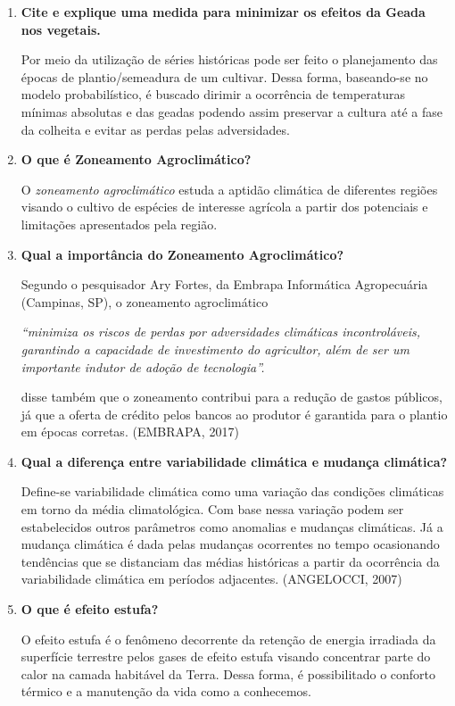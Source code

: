 \documentclass[a4paper, 12pt]{article}
\begin{document}
\begin{enumerate}
		\item\textbf{Cite e explique uma medida para minimizar os efeitos da Geada nos vegetais.}
		
		Por meio da utilização de séries históricas pode ser feito o planejamento das épocas de plantio/semeadura de um cultivar. Dessa forma, baseando-se no modelo probabilístico, é buscado dirimir a ocorrência de temperaturas mínimas absolutas e das geadas podendo assim preservar a cultura até a fase da colheita e evitar as perdas pelas adversidades.
		
		\item\textbf{O que é Zoneamento Agroclimático?}
		
		O \textit{zoneamento agroclimático} estuda a aptidão climática de diferentes regiões visando o cultivo de espécies de interesse agrícola a partir dos potenciais e limitações apresentados pela região.
		
		\item\textbf{Qual a importância do Zoneamento Agroclimático?}
		
		Segundo o pesquisador Ary Fortes, da Embrapa Informática Agropecuária (Campinas, SP), o zoneamento agroclimático 
		
		\textit{``minimiza os riscos de perdas por adversidades climáticas incontroláveis, garantindo a capacidade de investimento do agricultor, além de ser um importante indutor de adoção de tecnologia''.}
		
		disse também que o zoneamento contribui para a redução de gastos públicos, já que a oferta de crédito pelos bancos ao produtor é garantida para o plantio em épocas corretas. (EMBRAPA, 2017)
		
		\item\textbf{Qual a diferença entre variabilidade climática e mudança climática?}
		
		Define-se variabilidade climática como uma variação das condições climáticas em torno da média climatológica. Com base nessa variação podem ser estabelecidos outros parâmetros como anomalias e mudanças climáticas. Já a mudança climática é dada pelas mudanças ocorrentes no tempo ocasionando tendências que se distanciam das médias históricas a partir da ocorrência da variabilidade climática em períodos adjacentes.
		(ANGELOCCI, 2007)
		
		\item\textbf{O que é efeito estufa?}
		
		O efeito estufa é o fenômeno decorrente da retenção de energia irradiada da superfície terrestre pelos gases de efeito estufa visando concentrar parte do calor na camada habitável da Terra. Dessa forma, é possibilitado o conforto térmico e a manutenção da vida como a conhecemos. 
		

\end{enumerate}
\end{document}
